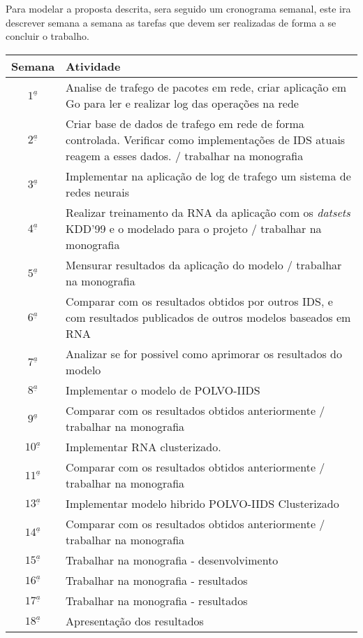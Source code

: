 \documentclass[
	12pt,				%
	openright,			%
	oneside,
	a4paper,			%
	english,			%
	french,				%
	spanish,			%
	brazil				%
	]{abntex2}
\begin{document}
Para modelar a proposta descrita, sera seguido um cronograma semanal, este ira descrever semana a semana as tarefas que devem ser realizadas de forma a se concluir o trabalho.


\vspace{.25cm}
\begin{center}
	\begin{tabular}{ |c| p{13.5cm} | }
		\hline
		\textbf{Semana} & \textbf{Atividade} \\ \hline \hline
		$1^{\underline a}$ & Analise de trafego de pacotes em rede, criar aplicação em Go para ler e realizar log das operações na rede \\ \hline
		$2^{\underline a}$ & Criar base de dados de trafego em rede de forma controlada. Verificar como implementações de IDS atuais reagem a esses dados. / trabalhar na monografia \\ \hline
		$3^{\underline a}$ & Implementar na aplicação de log de trafego um sistema de redes neurais \\ \hline		
		$4^{\underline a}$ & Realizar treinamento da RNA da aplicação com os \textit{datsets} KDD'99 e o modelado para o projeto / trabalhar na monografia \\ \hline		
		$5^{\underline a}$ & Mensurar resultados da aplicação do modelo / trabalhar na monografia \\ \hline		
		$6^{\underline a}$ & Comparar com os resultados obtidos por outros IDS, e com resultados publicados de outros modelos baseados em RNA  \\ \hline		
		$7^{\underline a}$ & Analizar se for possivel como aprimorar os resultados do modelo \\ \hline		
		$8^{\underline a}$ & Implementar o modelo de POLVO-IIDS \\ \hline		
		$9^{\underline a}$ & Comparar com os resultados obtidos anteriormente / trabalhar na monografia \\ \hline		
		$10^{\underline a}$ & Implementar RNA clusterizado. \\ \hline		
		$11^{\underline a}$ & Comparar com os resultados obtidos anteriormente / trabalhar na monografia \\ \hline		
		$13^{\underline a}$ & Implementar modelo hibrido POLVO-IIDS Clusterizado \\ \hline		
		$14^{\underline a}$ & Comparar com os resultados obtidos anteriormente / trabalhar na monografia \\ \hline		
		$15^{\underline a}$ & Trabalhar na monografia - desenvolvimento \\ \hline		
		$16^{\underline a}$ & Trabalhar na monografia - resultados \\ \hline		
		$17^{\underline a}$ & Trabalhar na monografia - resultados \\ \hline		
		$18^{\underline a}$ & Apresentação dos resultados \\ \hline
	\end{tabular}
\end{center}
\end{document}
